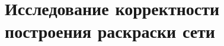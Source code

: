 \documentclass[12pt]{article}
\begin{document}
\hfill
\begin{minipage}[H]{0.22\linewidth}
\end{minipage}

\section{Исследование корректности построения раскраски сети}
\end{document}
